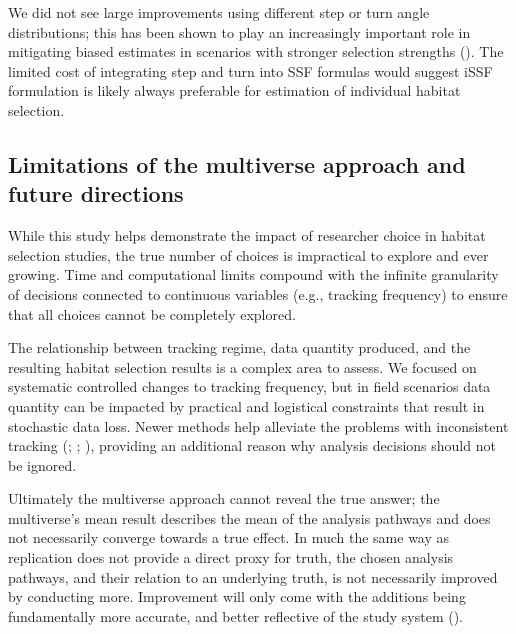 \documentclass[10pt,a4paper]{article}
\begin{document}
We did not see large improvements using different step or turn angle distributions; this has been shown to play an increasingly important role in mitigating biased estimates in scenarios with stronger selection strengths ().
The limited cost of integrating step and turn into SSF formulas would suggest iSSF formulation is likely always preferable for estimation of individual habitat selection.

\subsection{Limitations of the multiverse approach and future directions}\label{limitations-of-the-multiverse-approach-and-future-directions}

While this study helps demonstrate the impact of researcher choice in habitat selection studies, the true number of choices is impractical to explore and ever growing.
Time and computational limits compound with the infinite granularity of decisions connected to continuous variables (e.g., tracking frequency) to ensure that all choices cannot be completely explored.

The relationship between tracking regime, data quantity produced, and the resulting habitat selection results is a complex area to assess.
We focused on systematic controlled changes to tracking frequency, but in field scenarios data quantity can be impacted by practical and logistical constraints that result in stochastic data loss.
Newer methods help alleviate the problems with inconsistent tracking (; ; ), providing an additional reason why analysis decisions should not be ignored.

Ultimately the multiverse approach cannot reveal the true answer; the multiverse's mean result describes the mean of the analysis pathways and does not necessarily converge towards a true effect.
In much the same way as replication does not provide a direct proxy for truth, the chosen analysis pathways, and their relation to an underlying truth, is not necessarily improved by conducting more.
Improvement will only come with the additions being fundamentally more accurate, and better reflective of the study system ().
\end{document}
